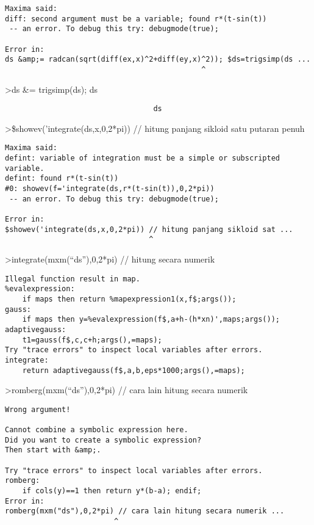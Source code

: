\documentclass[
]{book}
\begin{document}
\begin{verbatim}
Maxima said:
diff: second argument must be a variable; found r*(t-sin(t))
 -- an error. To debug this try: debugmode(true);

Error in:
ds &amp;= radcan(sqrt(diff(ex,x)^2+diff(ey,x)^2)); $ds=trigsimp(ds ...
                                             ^
\end{verbatim}

\textgreater ds \&= trigsimp(ds); ds

\begin{verbatim}
                                  ds
\end{verbatim}

\textgreater\$showev('integrate(ds,x,0,2*pi)) // hitung panjang sikloid satu putaran penuh

\begin{verbatim}
Maxima said:
defint: variable of integration must be a simple or subscripted variable.
defint: found r*(t-sin(t))
#0: showev(f='integrate(ds,r*(t-sin(t)),0,2*pi))
 -- an error. To debug this try: debugmode(true);

Error in:
$showev('integrate(ds,x,0,2*pi)) // hitung panjang sikloid sat ...
                                 ^
\end{verbatim}

\textgreater integrate(mxm(``ds''),0,2*pi) // hitung secara numerik

\begin{verbatim}
Illegal function result in map.
%evalexpression:
    if maps then return %mapexpression1(x,f$;args());
gauss:
    if maps then y=%evalexpression(f$,a+h-(h*xn)',maps;args());
adaptivegauss:
    t1=gauss(f$,c,c+h;args(),=maps);
Try "trace errors" to inspect local variables after errors.
integrate:
    return adaptivegauss(f$,a,b,eps*1000;args(),=maps);
\end{verbatim}

\textgreater romberg(mxm(``ds''),0,2*pi) // cara lain hitung secara numerik

\begin{verbatim}
Wrong argument!

Cannot combine a symbolic expression here.
Did you want to create a symbolic expression?
Then start with &amp;.

Try "trace errors" to inspect local variables after errors.
romberg:
    if cols(y)==1 then return y*(b-a); endif;
Error in:
romberg(mxm("ds"),0,2*pi) // cara lain hitung secara numerik ...
                         ^
\end{verbatim}
\end{document}
